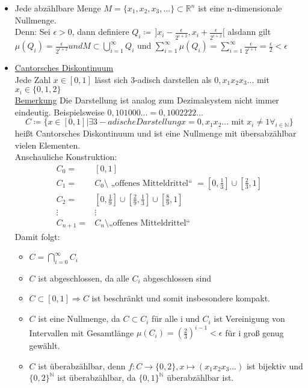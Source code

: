 \begin{itemize}
	\item Jede abzählbare Menge $M = \{x_1, x_2, x_3, ...\} \subset \mathbb{R}^n$ ist eine n-dimensionale Nullmenge.\\
	Denn: Sei $\epsilon > 0$, dann definiere $Q_i \coloneqq\, ]x_i - \frac{\epsilon}{2^{i+2}}, x_i + \frac{\epsilon}{2^{i+2}}[$ alsdann gilt $\mu(Q_i) = \frac{\epsilon}{2^{i+2}} und M \subset \bigcup_{i=1}^{\infty} Q_i$ und $\sum_{i=1}^{\infty} \mu(Q_i) = \sum_{i=1}^{\infty} \frac{\epsilon}{2^{i+1}} = \frac{\epsilon}{2} < \epsilon$
	\item \underline{Cantorsches Diskontinuum}\\
	Jede Zahl $x \in [0,1]$ lässt sich 3-adisch darstellen als $0,x_1 x_2 x_3 ...$ mit $x_i \in \{0,1,2\}$\\
	\underline{Bemerkung}
	Die Darstellung ist analog zum Dezimalsystem nicht immer eindeutig. Beispielsweise $0,101000... = 0,1002222...$
	\[C\coloneqq \{x \in [0,1] | \exists 3-adische Darstellung x = 0,x_1x_2... \text{ mit } x_i \neq 1 \forall_{i \in \mathbb{N}}\}\] heißt Cantorsches Diskontinuum und ist eine Nullmenge mit übersabzählbar vielen Elementen.\\
	Anschauliche Konstruktion:
\begin{equation*}
	\begin{matrix}
		C_0 = & [0,1]\\
		C_1 = & C_0 \setminus \text{ „offenes Mitteldrittel“ } = [0,\frac{1}{3}] \cup [\frac{2}{3}, 1]\\
		C_2 = & [0,\frac{1}{9}] \cup [\frac{2}{9}, \frac{1}{3}] \cup [\frac{8}{9}, 1]\\
		\vdots & \vdots\\
		C_{n+1} = & C_n \setminus \text{„offenes Mitteldrittel“}
	\end{matrix}
\end{equation*}
Damit folgt:
\begin{itemize}
	\item $C = \bigcap_{i=0}^{\infty} C_i$
	\item $C$ ist abgeschlossen, da alle $C_i$ abgeschlossen sind
	\item $C \subset [0,1] \Rightarrow C $ ist beschränkt und somit insbesondere kompakt.
	\item $C$ ist eine Nullmenge, da $C \subset C_i$ für alle i und $C_i$ ist Vereinigung von Intervallen mit Gesamtlänge $\mu(C_i) = (\frac{2}{3})^{i-1} < \epsilon$ für i groß genug gewählt.
	\item $C$ ist überabzählbar, denn $f\colon C\to \{0,2\}, x\mapsto (x_1 x_2 x_3 ...)$ ist bijektiv und $\{0,2\}^{\mathbb{N}}$ ist überabzählbar, da $\{0,1\}^{\mathbb{N}}$ überabzählbar ist.
\end{itemize}
\end{itemize}

